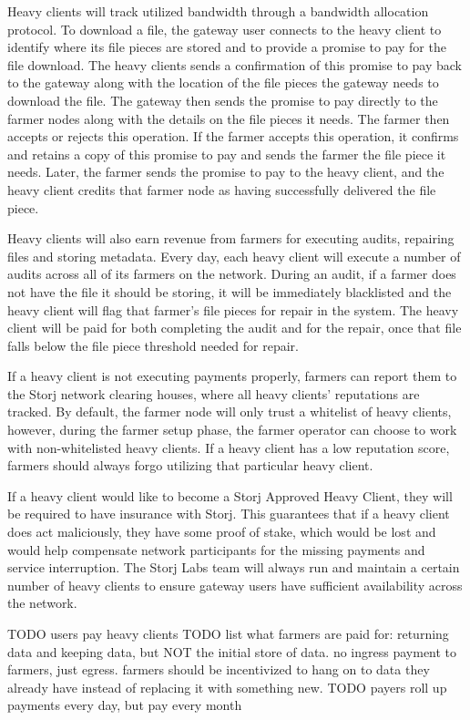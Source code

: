 \documentclass[a4paper,10pt]{article} \usepackage[utf8]{inputenc}
\newcommand{\todo}[1]{{\color{red} TODO #1 }}
\begin{document}
Heavy clients will track utilized bandwidth through a bandwidth allocation
protocol. To download a file, the gateway user connects to the heavy client to
identify where its file pieces are stored and to provide a promise to pay for
the file download. The heavy clients sends a confirmation of this promise to
pay back to the gateway along with the location of the file pieces the gateway
needs to download the file. The gateway then sends the promise to pay directly
to the farmer nodes along with the details on the file pieces it needs. The
farmer then accepts or rejects this operation. If the farmer accepts this
operation, it confirms and retains a copy of this promise to pay and sends the
farmer the file piece it needs. Later, the farmer sends the promise to pay to
the heavy client, and the heavy client credits that farmer node as having
successfully delivered the file piece.

Heavy clients will also earn revenue from farmers for executing audits,
repairing files and storing metadata. Every day, each heavy client will execute
a number of audits across all of its farmers on the network. During an audit,
if a farmer does not have the file it should be storing, it will be immediately
blacklisted and the heavy client will flag that farmer’s file pieces for repair
in the system. The heavy client will be paid for both completing the audit and
for the repair, once that file falls below the file piece threshold needed for
repair.

If a heavy client is not executing payments properly, farmers can report them
to the Storj network clearing houses, where all heavy clients’ reputations are
tracked. By default, the farmer node will only trust a whitelist of heavy
clients, however, during the farmer setup phase, the farmer operator can choose
to work with non-whitelisted heavy clients. If a heavy client has a low
reputation score, farmers should always forgo utilizing that particular heavy
client.

If a heavy  client  would  like  to  become  a  Storj  Approved Heavy Client,
they will be required to have insurance with Storj. This guarantees that if a
heavy client does act maliciously, they have some proof of stake, which would
be lost and would help compensate network participants for the missing payments
and service interruption. The Storj Labs team will always run and maintain a
certain number of heavy clients to ensure gateway users have sufficient
availability across the network.

\todo{users pay heavy clients}
\todo{list what farmers are paid for: returning data and keeping data, but
NOT the initial store of data. no ingress payment to farmers, just egress.
farmers should be incentivized to hang on to data they already have instead of
replacing it with something new.}
\todo{payers roll up payments every day, but pay every month}
\end{document}
